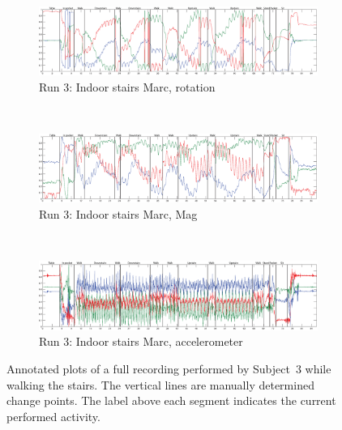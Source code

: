 \begin{figure}
  \centering
  \begin{subfigure}[b]{1\textwidth}
    \includegraphics[width=\textwidth]{./Figures/chapter6/data_collection/stairs-1-marc/data_plot_rot_annotated.eps}
    \caption{Run 3: Indoor stairs Marc, rotation}
    \label{fig:data_gathering_run_3_rot}
  \end{subfigure} \\

  \begin{subfigure}[b]{1\textwidth}
    \includegraphics[width=\textwidth]{./Figures/chapter6/data_collection/stairs-1-marc/data_plot_mag_annotated.eps}
    \caption{Run 3: Indoor stairs Marc, Mag}
    \label{fig:data_gathering_run_3_mag}
  \end{subfigure} \\

  \begin{subfigure}[b]{1\textwidth}
    \includegraphics[width=\textwidth]{./Figures/chapter6/data_collection/stairs-1-marc/data_plot_acc_annotated.eps}
    \caption{Run 3: Indoor stairs Marc, accelerometer}
    \label{fig:data_gathering_run_3_acc}
  \end{subfigure}
  \caption[Plots subject 3]{Annotated plots of a full recording performed by Subject~$3$ while walking the stairs. The vertical lines are manually determined change points. The label above each segment indicates the current performed activity.}\label{fig:plots_subject_3}
\end{figure}